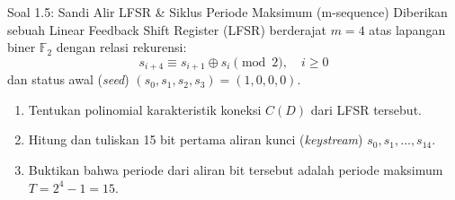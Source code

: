 \documentclass[11pt,a4paper]{article}
\begin{document}
\vspace{0.4cm}

\begin{soalbox}{Soal 1.5: Sandi Alir LFSR \& Siklus Periode Maksimum (m-sequence)}
Diberikan sebuah Linear Feedback Shift Register (LFSR) berderajat $m = 4$ atas lapangan biner $\mathbb{F}_2$ dengan relasi rekurensi:
\[
s_{i+4} \equiv s_{i+1} \oplus s_i \pmod 2, \quad i \ge 0
\]
dan status awal (\textit{seed}) $(s_0, s_1, s_2, s_3) = (1, 0, 0, 0)$.
\begin{enumerate}[label=(\alph*)]
    \item Tentukan polinomial karakteristik koneksi $C(D)$ dari LFSR tersebut.
    \item Hitung dan tuliskan 15 bit pertama aliran kunci (\textit{keystream}) $s_0, s_1, \dots, s_{14}$.
    \item Buktikan bahwa periode dari aliran bit tersebut adalah periode maksimum $T = 2^4 - 1 = 15$.
\end{enumerate}
\end{soalbox}
\end{document}
